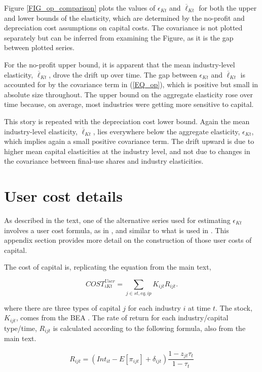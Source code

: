 \documentclass[11pt]{article}
\begin{document}
Figure \ref{FIG_op_comparison} plots the values of $\epsilon_{Kt}$ and $\overline{\ell}_{Kt}$ for both the upper and lower bounds of the elasticity, which are determined by the no-profit and depreciation cost assumptions on capital costs. The covariance is not plotted separately but can be inferred from examining the Figure, as it is the gap between plotted series. 

For the no-profit upper bound, it is apparent that the mean industry-level elasticity, $\overline{\ell}_{Kt}$, drove the drift up over time. The gap between $\epsilon_{Kt}$ and $\overline{\ell}_{Kt}$ is accounted for by the covariance term in (\ref{EQ_op}), which is positive but small in absolute size throughout. The upper bound on the aggregate elasticity rose over time because, on average, most industries were getting more sensitive to capital. 

This story is repeated with the depreciation cost lower bound. Again the mean industry-level elasticity, $\overline{\ell}_{Kt}$, lies everywhere below the aggregate elasticity, $\epsilon_{Kt}$, which implies again a small positive covariance term. The drift upward is due to higher mean capital elasticities at the industry level, and not due to changes in the covariance between final-use shares and industry elasticities. 

\section{User cost details}\label{SEC_usercost}
As described in the text, one of the alternative series used for estimating $\epsilon_{Kt}$ involves a user cost formula, as in \cite{halljorg1967}, and similar to what is used in \cite{Barkai000,rognlie2015}. This appendix section provides more detail on the construction of those user costs of capital. 

The cost of capital is, replicating the equation from the main text,

\begin{equation}
	COST^{User}_{iKt} = \sum_{j \in st,eq,ip} K_{ijt} R_{ijt}.
\end{equation}

where there are three types of capital $j$ for each industry $i$ at time $t$. The stock, $K_{ijt}$, comes from the BEA \citep{beacap,beagov}. The rate of return for each industry/capital type/time, $R_{ijt}$ is calculated according to the following formula, also from the main text.

\begin{equation}
	R_{ijt} = (Int_{it} - E[\pi_{ijt}] + \delta_{ijt})\frac{1-z_{jt} \tau_t}{1-\tau_t}
\end{equation}
\end{document}
